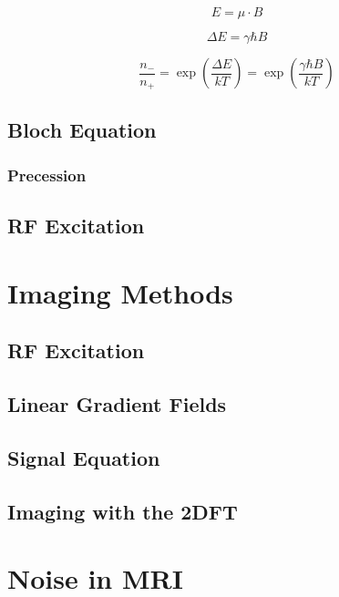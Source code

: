 \begin{equation}\label{eq:spin_energy}
    E = \mu \cdot B
\end{equation}

\begin{equation}\label{eq:delta_E}
    \Delta E = \gamma \hbar B
\end{equation}

\begin{equation}\label{eq:boltzmann}
    \frac{n_-}{n_+} = \exp(\frac{\Delta E}{k T}) = \exp(\frac{\gamma \hbar B}{k T})
\end{equation}

\subsection{Bloch Equation}

\subsubsection{Precession}

\subsection{RF Excitation}

\section{Imaging Methods}
\subsection{RF Excitation}
\subsection{Linear Gradient Fields}
\subsection{Signal Equation}
\subsection{Imaging with the 2DFT}

\section{Noise in MRI}
